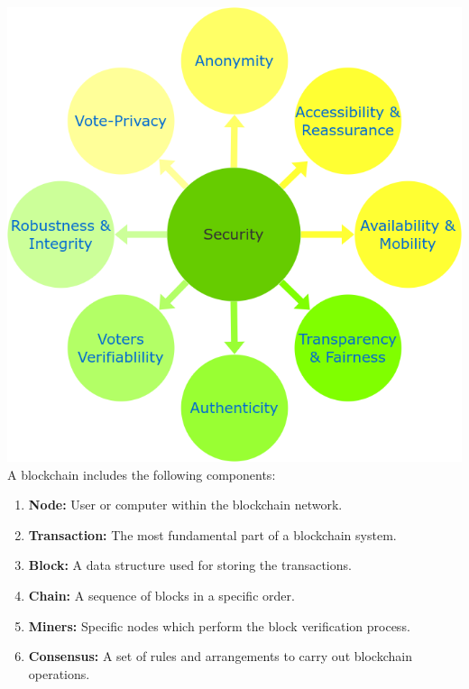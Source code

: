 \documentclass{IEEEtran}
\begin{document}
      \includegraphics[width=\linewidth]{Resources/SecurityFlower.png}
      A blockchain includes the following components:
      \begin{enumerate}
        \item \textbf{Node:} User or computer within the blockchain network.
        \item \textbf{Transaction:} The most fundamental part of a blockchain system.
        \item \textbf{Block:} A data structure used for storing the transactions.
        \item \textbf{Chain:} A sequence of blocks in a specific order.
        \item \textbf{Miners:} Specific nodes which perform the block verification process.
        \item \textbf{Consensus:} A set of rules and arrangements to carry out blockchain operations.
      \end{enumerate}
\end{document}
